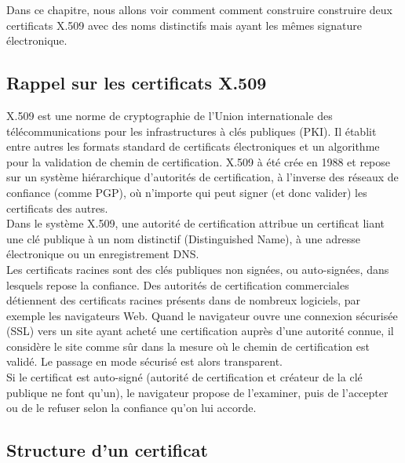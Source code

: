 \documentclass[a4paper,11pt,french]{article}
\begin{document}
Dans ce chapitre, nous allons voir comment comment construire construire deux certificats X.509 avec des noms distinctifs mais ayant les mêmes signature électronique.

\subsection{Rappel sur les certificats X.509}

X.509 est une norme de cryptographie de l'Union internationale des télécommunications pour les infrastructures à clés publiques (PKI). Il établit entre autres les formats standard de certificats électroniques et un algorithme pour la validation de chemin de certification. X.509 à été crée en 1988  et repose sur un système hiérarchique d'autorités de certification, à l'inverse des réseaux de confiance (comme PGP), où n'importe qui peut signer (et donc valider) les certificats des autres.\\

Dans le système X.509, une autorité de certification attribue un certificat liant une clé publique à un nom distinctif (Distinguished Name), à une adresse électronique ou un enregistrement DNS.\\

Les certificats racines sont des clés publiques non signées, ou auto-signées, dans lesquels repose la confiance. Des autorités de certification commerciales détiennent des certificats racines présents dans de nombreux logiciels, par exemple les navigateurs Web. Quand le navigateur ouvre une connexion sécurisée (SSL) vers un site ayant acheté une certification auprès d'une autorité connue, il considère le site comme sûr dans la mesure où le chemin de certification est validé. Le passage en mode sécurisé est alors transparent.\\

Si le certificat est auto-signé (autorité de certification et créateur de la clé publique ne font qu'un), le navigateur propose de l'examiner, puis de l'accepter ou de le refuser selon la confiance qu'on lui accorde.\\

\subsection{Structure d'un certificat}
\end{document}
